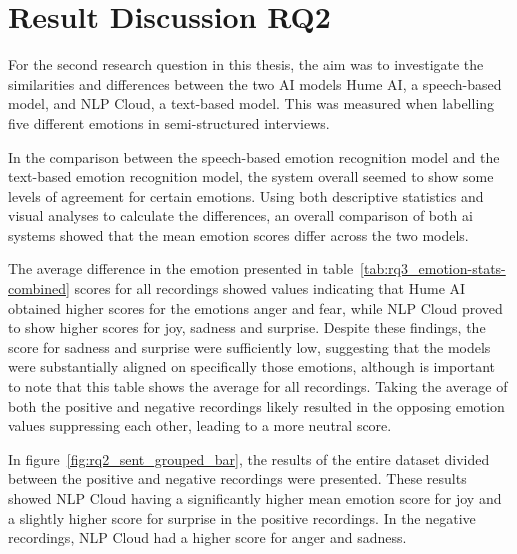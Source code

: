 
\section{Result Discussion RQ2}
For the second research question in this thesis, the aim was to investigate the similarities and differences between the two AI models Hume AI, a speech-based model, and NLP Cloud, a text-based model. This was measured when labelling five different emotions in semi-structured interviews.

\label{subsec:RQ2interpretation}
In the comparison between the speech-based emotion recognition model and the text-based emotion recognition model, the system overall seemed to show some levels of agreement for certain emotions. Using both descriptive statistics and visual analyses to calculate the differences, an overall comparison of both ai systems showed that the mean emotion scores differ across the two models.

The average difference in the emotion presented in table~\ref{tab:rq3_emotion-stats-combined} scores for all recordings showed values indicating that Hume AI obtained higher scores for the emotions anger and fear, while NLP Cloud proved to show higher scores for joy, sadness and surprise. Despite these findings, the score for sadness and surprise were sufficiently low, suggesting that the models were substantially aligned on specifically those emotions, although is important to note that this table shows the average for all recordings. Taking the average of both the positive and negative recordings likely resulted in the opposing emotion values suppressing each other, leading to a more neutral score.

In figure~\ref{fig:rq2_sent_grouped_bar}, the results of the entire dataset divided between the positive and negative recordings were presented. These results showed NLP Cloud having a significantly higher mean emotion score for joy and a slightly higher score for surprise in the positive recordings. In the negative recordings, NLP Cloud had a higher score for anger and sadness. 

